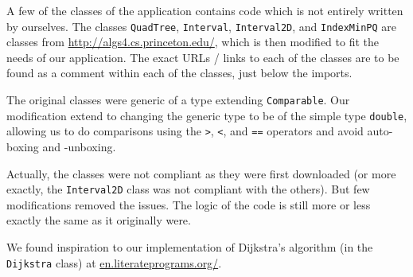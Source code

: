 A few of the classes of the application contains code which is not entirely written by ourselves. The classes \texttt{QuadTree}, \texttt{Interval}, \texttt{Interval2D}, and \texttt{IndexMinPQ} are classes from \url{http://algs4.cs.princeton.edu/}, which is then modified to fit the needs of our application. The exact URLs / links to each of the classes are to be found as a comment within each of the classes, just below the imports.

The original classes were generic of a type extending \texttt{Comparable}. Our modification extend to changing the generic type to be of the simple type \texttt{double}, allowing us to do comparisons using the \texttt{>}, \texttt{<}, and \texttt{==} operators and avoid auto-boxing and -unboxing.

Actually, the classes were not compliant as they were first downloaded (or more exactly, the \texttt{Interval2D} class was not compliant with the others). But few modifications removed the issues. The logic of the code is still more or less exactly the same as it originally were.

We found inspiration to our implementation of Dijkstra's algorithm (in the \texttt{Dijkstra} class) at \href{http://en.literateprograms.org/Special:DownloadCode/Dijkstra\%27s_algorithm_(Java)}{en.literateprograms.org/}.